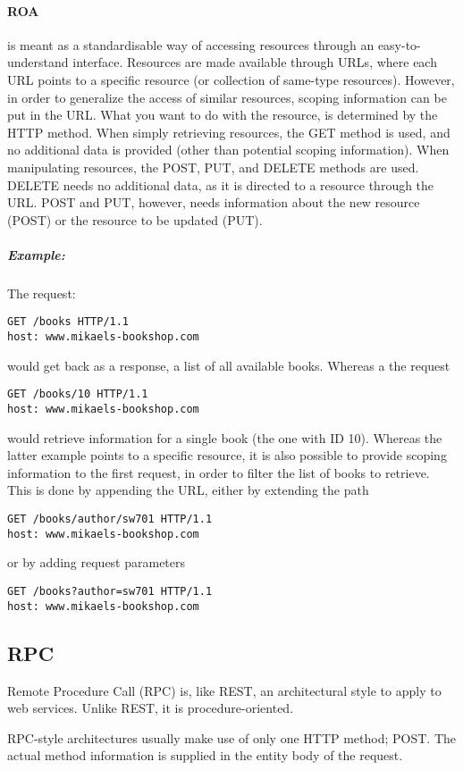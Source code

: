 \paragraph{ROA} is meant as a standardisable way of accessing resources through an easy-to-understand interface.
Resources are made available through URLs, where each URL points to a specific resource (or collection of same-type resources).
However, in order to generalize the access of similar resources, scoping information can be put in the URL.
What you want to do with the resource, is determined by the HTTP method.
When simply retrieving resources, the GET method is used, and no additional data is provided (other than potential scoping information).
When manipulating resources, the POST, PUT, and DELETE methods are used.
DELETE needs no additional data, as it is directed to a resource through the URL.
POST and PUT, however, needs information about the new resource (POST) or the resource to be updated (PUT).
\subparagraph{Example:} The request:

\begin{lstlisting}
GET /books HTTP/1.1
host: www.mikaels-bookshop.com
\end{lstlisting}
would get back as a response, a list of all available books.
Whereas a the request
\begin{lstlisting}
GET /books/10 HTTP/1.1
host: www.mikaels-bookshop.com
\end{lstlisting}
would retrieve information for a single book (the one with ID  10).
Whereas the latter example points to a specific resource, it is also possible to provide scoping information to the first request, in order to filter the list of books to retrieve.
This is done by appending the URL, either by extending the path
\begin{lstlisting}
GET /books/author/sw701 HTTP/1.1
host: www.mikaels-bookshop.com
\end{lstlisting}
or by adding request parameters
\begin{lstlisting}
GET /books?author=sw701 HTTP/1.1
host: www.mikaels-bookshop.com
\end{lstlisting}

\subsection{RPC}
Remote Procedure Call (RPC) is, like REST, an architectural style to apply to web services.
Unlike REST, it is procedure-oriented.

RPC-style architectures usually make use of only one HTTP method; POST.
The actual method information is supplied in the entity body of the request.

